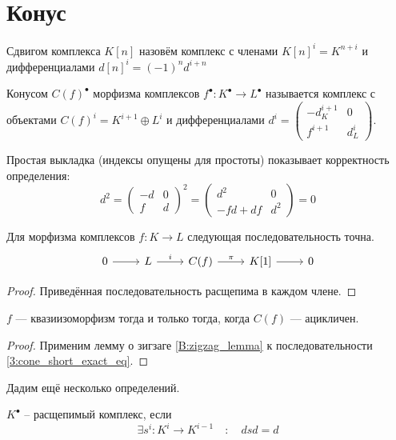 \documentclass[../main.tex]{subfiles}
\begin{document}
\section{Конус}
\begin{to_def}
Сдвигом комплекса $K[n]$ назовём комплекс с членами $K[n]^i = K^{n+i}$ и дифференциалами $d[n]^i = (-1)^nd^{i+n}$
\end{to_def}
\begin{to_def}
Конусом $C(f)^\bullet$ морфизма комплексов $f^\bullet:K^\bullet\to L^\bullet$ называется комплекс с объектами $C(f)^i = K^{i+1}\oplus L^i$ и дифференциалами $d^i = \begin{pmatrix}-d_K^{i+1}&0\\f^{i+1}&d_L^i\end{pmatrix}$.
\end{to_def}
Простая выкладка (индексы опущены для простоты) показывает корректность определения:
\begin{equation*}
d^2 = \begin{pmatrix}-d&0\\f&d\end{pmatrix}^2 = \begin{pmatrix}d^2&0\\-fd + df&d^2\end{pmatrix} = 0
\end{equation*}
\begin{to_suj}\label{3:cone_short_exact}
Для морфизма комплексов $f:K\to L$ следующая последовательность точна.
\begin{equation}\label{3:cone_short_exact_eq}
    \begin{tikzcd}
	0 & L & {C(f)} & {K[1]} & 0
	\arrow[from=1-1, to=1-2]
	\arrow["i", from=1-2, to=1-3]
	\arrow["\pi", from=1-3, to=1-4]
	\arrow[from=1-4, to=1-5]
\end{tikzcd}
\end{equation}
\end{to_suj}
\begin{proof}
Приведённая последовательность расщепима в каждом члене.
\end{proof}
\begin{to_thr}
$f$ --- квазиизоморфизм тогда и только тогда, когда $C(f)$ --- ацикличен.
\end{to_thr}
\begin{proof}
    Применим лемму о зигзаге \ref{B:zigzag_lemma} к последовательности \eqref{3:cone_short_exact_eq}.
\end{proof}
Дадим ещё несколько определений.
\begin{to_def}
$K^\bullet$ -- расщепимый комплекс, если 
\[\exists s^i\colon K^{i} \to K^{i-1} \quad \colon \quad dsd = d \]
\end{to_def}
\end{document}

